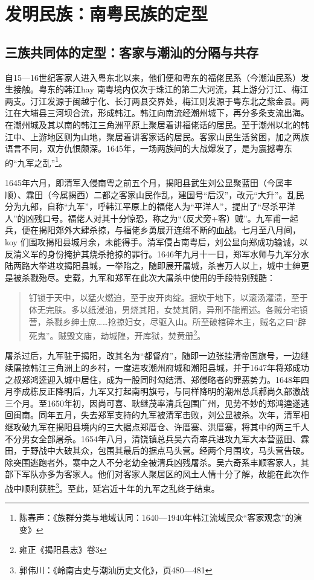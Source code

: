 \chapter{发明民族：南粤民族的定型}

\section{三族共同体的定型：客家与潮汕的分隔与共存}

\indent 自15—16世纪客家人进入粤东北以来，他们便和粤东的福佬民系（今潮汕民系）发生接触。粤东的韩江hay 南粤境内仅次于珠江的第二大河流，其上游分汀江、梅江两支。汀江发源于闽越宁化、长汀两县交界处，梅江则发源于粤东北之紫金县。两江在大埔县三河坝合流，形成韩江。韩江向南流经潮州城下，再分多条支流出海。在潮州城及其以南的韩江三角洲平原上聚居着讲福佬话的居民。至于潮州以北的韩江中、上游地区则为山地，聚居着讲客家话的居民。客家山民生活贫困，加之两族语言不同，双方仇恨颇深。1645年，一场两族间的大战爆发了，是为震撼粤东的“九军之乱”\footnote{ 陈春声：《族群分类与地域认同：1640—1940年韩江流域民众“客家观念”的演变》}。

1645年六月，即清军入侵南粤之前五个月，揭阳县武生刘公显聚蓝田（今属丰顺）、霖田（今属揭西）二都之客家山民作乱，建国号“后汉”，改元“大升”。乱民分为九部，自称“九军”，呼韩江平原上的福佬人为“平洋人”，提出了“尽杀平洋人”的凶残口号。福佬人对其十分惊恐，称之为“（反犬旁+客）贼”。九军甫一起兵，便在揭阳郊外大肆杀掠，与福佬乡勇展开连绵不断的血战。七月至八月间，koy 们围攻揭阳县城月余，未能得手。清军侵占南粤后，刘公显向郑成功输诚，以反清义军的身份掩护其烧杀抢掠的罪行。1646年九月十一日，郑军水师与九军分水陆两路大举进攻揭阳县城，一举陷之，随即展开屠城，杀害万人以上，城中士绅更是被杀戮殆尽。史载，九军和郑军在此次大屠杀中使用的手段特别残酷：

\begin{quote}

钉锁于天中，以猛火燃迫，至于皮开肉绽。掘坎于地下，以滚汤灌渍，至于体无完肤。多以纸浸油，男烧其阳，女焚其阴，异刑不能阐述。各贼分宅镇营，杀戮乡绅士庶……抢掠妇女，尽驱入山。所至破棺碎木主，贼名之曰“辟死鬼”。贼毁文庙，劫城隍，开库狱，焚黄册\footnote{雍正《揭阳县志》卷3}。

\end{quote}

屠杀过后，九军驻于揭阳，改其名为“都督府”，随即一边张挂清帝国旗号，一边继续屠掠韩江三角洲上的乡村，一度进攻潮州府城和潮阳县城，并于1647年将郑成功之叔郑鸿逵迎入城中居住，成为一股同时勾结清、郑侵略者的罪恶势力。1648年四月李成栋反正降明后，九军又打起南明旗号，与同样降明的潮州总兵郝尚久部激战三个月。至1650年初，因尚可喜、耿继茂率清兵包围广州，见势不妙的郑鸿逵遂逃回闽南。同年五月，失去郑军支持的九军被清军击败，刘公显被杀。次年，清军相继攻破九军在揭阳县境内的三大据点郑厝仓、许厝寨、洪厝寨，将其中的两三千人不分男女全部屠杀。1654年八月，清饶镇总兵吴六奇率兵进攻九军大本营蓝田、霖田，于野战中大破其众，包围其最后的据点马头营。经两个月围攻，马头营告破。除突围逃跑者外，寨中之人不分老幼全被清兵凶残屠杀。吴六奇系丰顺客家人，其部下军队亦多为客家人。他们对客家人聚居区的风土人情十分了解，故能在此次作战中顺利获胜\footnote{郭伟川：《岭南古史与潮汕历史文化》，页480—481}。至此，延宕近十年的九军之乱终于结束。

